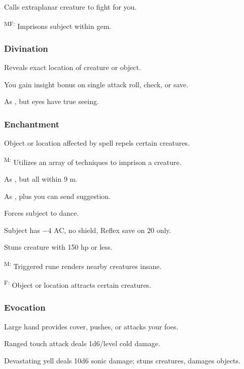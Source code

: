 	 Calls extraplanar creature to fight for you.

	\textsuperscript{MF:} Imprisons subject within gem.

\subsubsection{Divination}
	 Reveals exact location of creature or object.

	 You gain insight bonus on single attack roll, check, or save.

	 As , but eyes have true seeing.

\subsubsection{Enchantment}
	 Object or location affected by spell repels certain creatures.

	\textsuperscript{M:} Utilizes an array of techniques to imprison a creature.

	 As , but all within 9 m.

	 As , plus you can send suggestion.

	 Forces subject to dance.

	 Subject has $-4$ AC, no shield, Reflex save on 20 only.

	 Stuns creature with 150 hp or less.

	\textsuperscript{M:} Triggered rune renders nearby creatures insane.

	\textsuperscript{F:} Object or location attracts certain creatures.

\subsubsection{Evocation}
	 Large hand provides cover, pushes, or attacks your foes.

	 Ranged touch attack deals 1d6/level cold damage.

	 Devastating yell deals 10d6 sonic damage; stuns creatures, damages objects.


